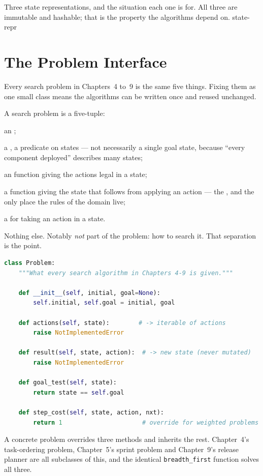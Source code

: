 {Three state representations, and the situation each one is for. All three are
immutable and hashable; that is the property the algorithms depend on.}
{state-repr}

\section{The Problem Interface}

Every search problem in Chapters~4 to~9 is the same five things. Fixing them as one
small class means the algorithms can be written once and reused unchanged.

\begin{definitionbox}
A search problem is a five-tuple:
\begin{tight}
  \item an ;
  \item a , a predicate on states --- not necessarily a single
        goal state, because ``every component deployed'' describes many states;
  \item an  function giving the actions legal in a state;
  \item a  function giving the state that follows from applying an
        action --- the , and the only place the rules of
        the domain live;
  \item a  for taking an action in a state.
\end{tight}
Nothing else. Notably \emph{not} part of the problem: how to search it. That
separation is the point.
\end{definitionbox}

\begin{examplebox}
\begin{lstlisting}[language=Python]
class Problem:
    """What every search algorithm in Chapters 4-9 is given."""

    def __init__(self, initial, goal=None):
        self.initial, self.goal = initial, goal

    def actions(self, state):        # -> iterable of actions
        raise NotImplementedError

    def result(self, state, action):  # -> new state (never mutated)
        raise NotImplementedError

    def goal_test(self, state):
        return state == self.goal

    def step_cost(self, state, action, nxt):
        return 1                      # override for weighted problems
\end{lstlisting}
A concrete problem overrides three methods and inherits the rest. Chapter~4's
task-ordering problem, Chapter~5's sprint problem and Chapter~9's release planner
are all subclasses of this, and the identical \texttt{breadth\_first} function
solves all three.
\end{examplebox}

